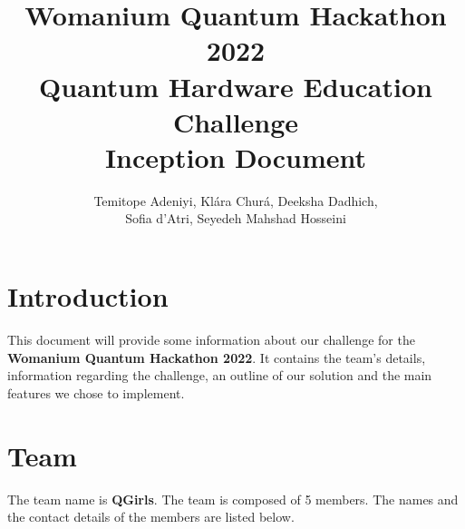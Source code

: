 \documentclass[hidelinks, a4paper,12pt]{article}
\title{Womanium Quantum Hackathon 2022\\Quantum Hardware Education Challenge\\Inception Document}
\author{Temitope Adeniyi, Klára Churá, Deeksha Dadhich,\\Sofia d'Atri, Seyedeh Mahshad Hosseini}
\date{}
\begin{document}
\maketitle

\tableofcontents

\newpage
\section{Introduction}
This document will provide some information about our challenge for the \textbf{Womanium Quantum Hackathon 2022}. It contains the team's details, information regarding the challenge, an outline of our solution and the main features we chose to implement.

\section{Team}
The team name is \textbf{QGirls}. The team is composed of 5 members. The names and the contact details of the members are listed below.\\
\end{document}
